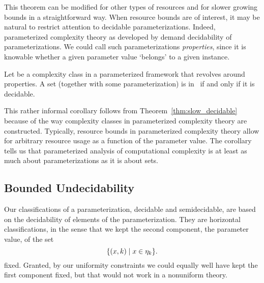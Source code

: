 This theorem can be modified for other types of resources and for slower growing bounds in a straightforward way.
When resource bounds are of interest, it may be natural to restrict attention to decidable parameterizations.
Indeed, parameterized complexity theory as developed by \textcite{flum2006parameterized} demand decidability of parameterizations.
We could call such parameterizations \emph{properties}, since it is knowable whether a given parameter value `belongs' to a given instance.
\begin{corollary}
\label{cor:decidable}%
  Let  be a complexity class in a parameterized framework that revolves around properties.
  A set (together with some parameterization) is in~ if and only if it is decidable.
\end{corollary}
This rather informal corollary follows from Theorem~\ref{thm:slow_decidable} because of the way complexity classes in parameterized complexity theory are constructed.
Typically, resource bounds in parameterized complexity theory allow for arbitrary resource usage as a function of the parameter value.
The corollary tells us that parameterized analysis of computational complexity is at least as much about parameterizations as it is about sets.

\subsection{Bounded Undecidability}
Our classifications of a parameterization, decidable and semidecidable, are based on the decidability of elements of the parameterization.
They are horizontal classifications, in the sense that we kept the second component, the parameter value, of the set
\begin{equation*}
  \{(x, k) \;|\; x \in \eta_k\}.
\end{equation*}
fixed.
Granted, by our uniformity constraints we could equally well have kept the first component fixed, but that would not work in a nonuniform theory.

